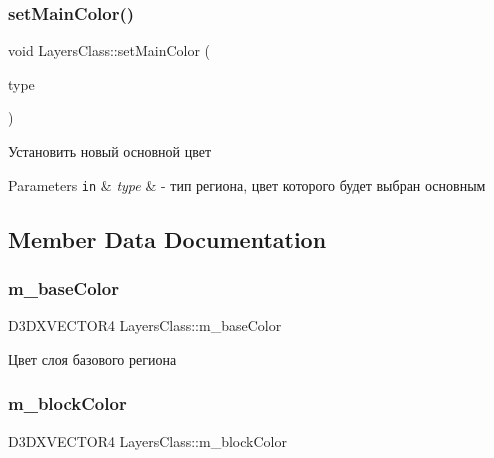 \subsubsection{\texorpdfstring{set\+Main\+Color()}{setMainColor()}}
{\footnotesize\ttfamily void Layers\+Class\+::set\+Main\+Color (\begin{DoxyParamCaption}\item[{\hyperlink{class_global_manager_class_a794b4a5298c61f8d25d9da44b7826857}{Global\+Manager\+Class\+::region\+Type}}]{type }\end{DoxyParamCaption})}



Установить новый основной цвет 


\begin{DoxyParams}[1]{Parameters}
\mbox{\tt in}  & {\em type} & -\/ тип региона, цвет которого будет выбран основным \\
\hline
\end{DoxyParams}


\subsection{Member Data Documentation}
\mbox{\label{class_layers_class_a9a09cba30388dd686738e4a5afb0ceb5}} 
\subsubsection{\texorpdfstring{m\+\_\+base\+Color}{m\_baseColor}}
{\footnotesize\ttfamily D3\+D\+X\+V\+E\+C\+T\+O\+R4 Layers\+Class\+::m\+\_\+base\+Color\hspace{0.3cm}{\ttfamily [private]}}



Цвет слоя базового региона 

\mbox{\label{class_layers_class_a8e305c4a712556e6924c7fc44e74399f}} 
\subsubsection{\texorpdfstring{m\+\_\+block\+Color}{m\_blockColor}}
{\footnotesize\ttfamily D3\+D\+X\+V\+E\+C\+T\+O\+R4 Layers\+Class\+::m\+\_\+block\+Color\hspace{0.3cm}{\ttfamily [private]}}



